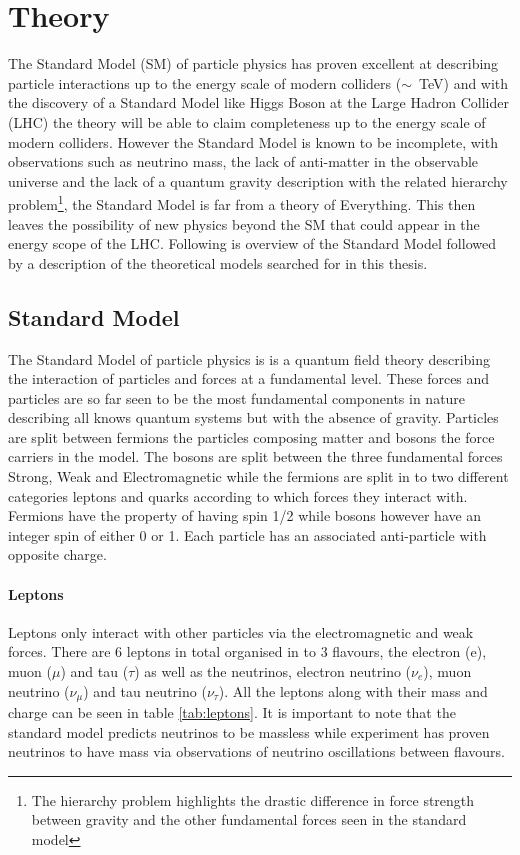 \chapter{Theory}

    The Standard Model (SM) of particle physics has proven excellent at describing particle interactions up to the energy scale of modern colliders ($\sim$~TeV) and with the discovery of a Standard Model like Higgs Boson at the Large Hadron Collider (LHC) the theory will be able to claim completeness up to the energy scale of modern colliders. However the Standard Model is known to be incomplete, with observations such as neutrino mass, the lack of anti-matter in the observable universe and the lack of a quantum gravity description with the related hierarchy problem\footnote{The hierarchy problem highlights the drastic difference in force strength between gravity and the other fundamental forces seen in the standard model}, the Standard Model is far from a theory of Everything. This then leaves the possibility of new physics beyond the SM that could appear in the energy scope of the LHC.
    Following is overview of the Standard Model \cite{ulrik:GriffEP2008} followed by a description of the theoretical models searched for in this thesis. 

\section{Standard Model}
    
    The Standard Model of particle physics is is a quantum field theory describing the interaction of particles and forces at a fundamental level. These forces and particles are so far seen to be the most fundamental components in nature describing all knows quantum systems but with the absence of gravity. Particles are split between fermions the particles composing matter and bosons the force carriers in the model. The bosons are split between the three fundamental forces Strong, Weak and Electromagnetic while the fermions are split in to two different categories leptons and quarks according to which forces they interact with. Fermions have the property of having spin 1/2 while bosons however have an integer spin of either 0 or 1. Each particle has an associated anti-particle with opposite charge. 

    \subsubsection*{Leptons}
    Leptons only interact with other particles via the electromagnetic and weak forces. There are 6 leptons in total organised in to 3 flavours, the electron (e), muon ($\mu$) and tau ($\tau$) as well as the neutrinos, electron neutrino ($\nu_{e}$), muon neutrino ($\nu_{\mu}$) and tau neutrino ($\nu_{\tau}$). All the leptons along with their mass and charge can be seen in table \ref{tab:leptons}. It is important to note that the standard model predicts neutrinos to be massless while experiment has proven neutrinos to have mass via observations of neutrino oscillations between flavours. 


